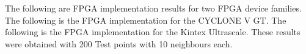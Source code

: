 \label{sec:ir}
\ifnum{}
\ifnum{}
The following are FPGA implementation results for two FPGA device families.
\fi
\ifnum{}
The following is the FPGA implementation for the CYCLONE V GT.
\fi
\fi
\ifnum{}
\ifnum{}
The following is the FPGA implementation for the Kintex Ultrascale. These
results were obtained with 200 Test points with 10 neighbours each.
\fi
\fi


